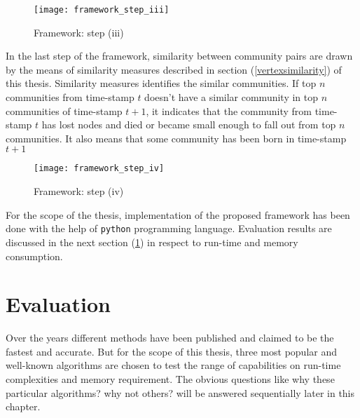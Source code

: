 \begin{figure}[H]
	\centering
	\texttt{[image: framework\_step\_iii]}
	\caption{Framework: step (iii)}
	\label{fig:community}
\end{figure}

In the last step of the framework, similarity between community pairs are drawn by the means of similarity measures described in section (\ref{vertexsimilarity}) of this thesis. Similarity measures identifies the similar communities. If top $n$ communities from time-stamp $t$ doesn't have a similar community in top $n$ communities of time-stamp $t+1$, it indicates that the community from time-stamp $t$ has lost nodes and died or became small enough to fall out from top $n$ communities. It also means that some community has been born in time-stamp $t+1$

\begin{figure}[H]
	\centering
	\texttt{[image: framework\_step\_iv]}
	\caption{Framework: step (iv)}
	\label{fig:community}
\end{figure}

For the scope of the thesis, implementation of the proposed framework has been done with the help of \texttt{python} programming language. Evaluation results are discussed in the next section (\ref{sec:evaluation}) in respect to run-time and memory consumption.

\section{Evaluation}\label{sec:evaluation}
Over the years different methods have been published and claimed to be the fastest and accurate. But for the scope of this thesis, three most popular and well-known algorithms are chosen to test the range of capabilities on run-time complexities and memory requirement. The obvious questions like why these particular algorithms? why not others? will be answered sequentially later in this chapter.

